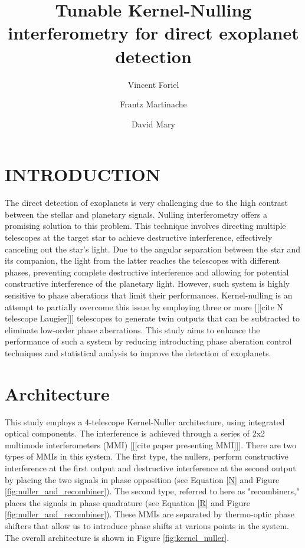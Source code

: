 \documentclass[]{spie}  %
\title{Tunable Kernel-Nulling interferometry for direct exoplanet detection}
\author[a,*]{Vincent Foriel}
\author[a]{Frantz Martinache}
\author[a]{David Mary}
\affil[a]{Université Côte d’Azur, Observatoire de la Côte d’Azur Nice, CNRS, Laboratoire Lagrange, Nice, France}
\begin{document}
\maketitle

\begin{abstract}

\end{abstract}


\section{INTRODUCTION}
\label{sec:intro} %

The direct detection of exoplanets is very challenging due to the high contrast between the stellar and planetary signals. Nulling interferometry offers a promising solution to this problem. This technique involves directing multiple telescopes at the target star to achieve destructive interference, effectively canceling out the star's light. Due to the angular separation between the star and its companion, the light from the latter reaches the telescopes with different phases, preventing complete destructive interference and allowing for potential constructive interference of the planetary light. However, such system is highly sensitive to phase aberations that limit their performances. Kernel-nulling is an attempt to partially overcome this issue by employing three or more [[[cite N telescope Laugier]]] telescopes to generate twin outputs that can be subtracted to eliminate low-order phase aberrations. This study aims to enhance the performance of such a system by reducing introducting phase aberation control techniques and statistical analysis to improve the detection of exoplanets.

\section{Architecture}

This study employs a 4-telescope Kernel-Nuller architecture, using integrated optical components. The interference is achieved through a series of 2x2 multimode interferometers (MMI) [[[cite paper presenting MMI]]]. There are two types of MMIs in this system. The first type, the nullers, perform constructive interference at the first output and destructive interference at the second output by placing the two signals in phase opposition (see Equation \ref{N} and Figure \ref{fig:nuller_and_recombiner}). The second type, referred to here as "recombiners," places the signals in phase quadrature (see Equation \ref{R} and Figure \ref{fig:nuller_and_recombiner}). These MMIs are separated by thermo-optic phase shifters that allow us to introduce phase shifts at various points in the system. The overall architecture is shown in Figure \ref{fig:kernel_nuller}.
\end{document}
